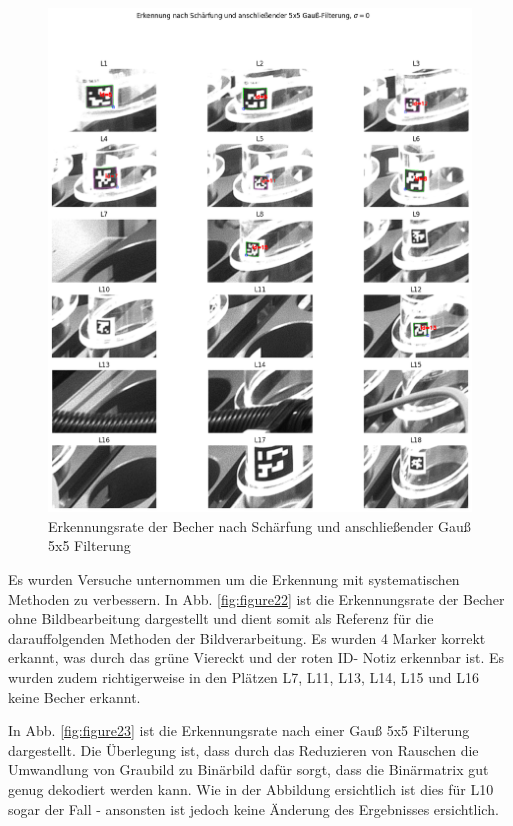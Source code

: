     \begin{figure}
        \caption[Erkennungsrate der Becher nach Schärfung und Gauß 5x5 Filterung]{Erkennungsrate der Becher nach Schärfung und anschließender Gauß 5x5 Filterung}\label{fig:figure26}
        \includegraphics[width = \textwidth]{Bilder/ErkennungsrateScharfGauss.png}
        \centering
    \end{figure}

    Es wurden Versuche unternommen um die Erkennung mit systematischen Methoden zu verbessern.
    In Abb. \ref{fig:figure22} ist die Erkennungsrate der Becher ohne Bildbearbeitung dargestellt und dient somit als Referenz für die darauffolgenden Methoden der Bildverarbeitung.
    Es wurden 4 Marker korrekt erkannt, was durch das grüne Viereckt und der roten ID- Notiz erkennbar ist. 
    Es wurden zudem richtigerweise in den Plätzen L7, L11, L13, L14, L15 und L16 keine Becher erkannt.

    In Abb. \ref{fig:figure23} ist die Erkennungsrate nach einer Gauß 5x5 Filterung dargestellt. 
    Die Überlegung ist, dass durch das Reduzieren von Rauschen die Umwandlung von Graubild zu Binärbild dafür sorgt, dass die Binärmatrix gut genug dekodiert werden kann. 
    Wie in der Abbildung ersichtlich ist dies für L10 sogar der Fall - ansonsten ist jedoch keine Änderung des Ergebnisses ersichtlich.

